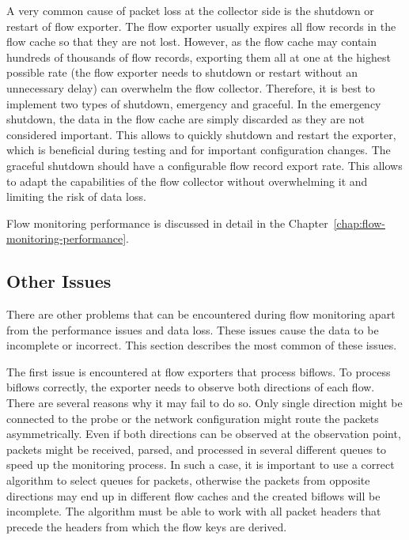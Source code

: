 A very common cause of packet loss at the collector side is the shutdown or restart of flow exporter. The flow exporter usually expires all flow records in the flow cache so that they are not lost. However, as the flow cache may contain hundreds of thousands of flow records, exporting them all at one at the highest possible rate (the flow exporter needs to shutdown or restart without an unnecessary delay) can overwhelm the flow collector. Therefore, it is best to implement two types of shutdown, emergency and graceful. In the emergency shutdown, the data in the flow cache are simply discarded as they are not considered important. This allows to quickly shutdown and restart the exporter, which is beneficial during testing and for important configuration changes. The graceful shutdown should have a configurable flow record export rate. This allows to adapt the capabilities of the flow collector without overwhelming it and limiting the risk of data loss.

Flow monitoring performance is discussed in detail in the Chapter~\ref{chap:flow-monitoring-performance}.


\subsection{Other Issues}

There are other problems that can be encountered during flow monitoring apart from the performance issues and data loss. These issues cause the data to be incomplete or incorrect. This section describes the most common of these issues.

The first issue is encountered at flow exporters that process biflows. To process biflows correctly, the exporter needs to observe both directions of each flow. There are several reasons why it may fail to do so. Only single direction might be connected to the probe or the network configuration might route the packets asymmetrically. Even if both directions can be observed at the observation point, packets might be received, parsed, and processed in several different queues to speed up the monitoring process. In such a case, it is important to use a correct algorithm to select queues for packets, otherwise the packets from opposite directions may end up in different flow caches and the created biflows will be incomplete. The algorithm must be able to work with all packet headers that precede the headers from which the flow keys are derived. 


